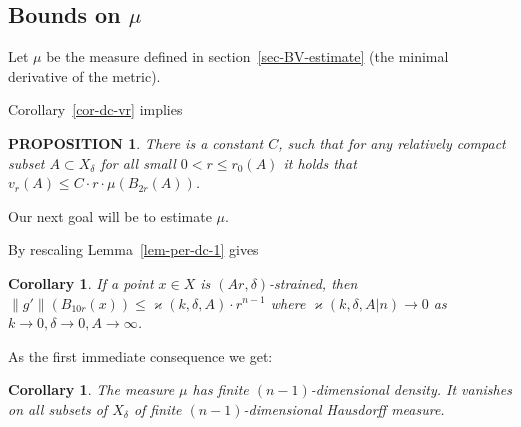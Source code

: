 \documentclass[12pt,leqno]{amsart}
\numberwithin{equation}{section}
\newtheorem{lem}[thm]{Lemma}
\newtheorem{cor}[thm]{Corollary}
\newtheorem{prop}[thm]{PROPOSITION}
\theoremstyle{definition}
\theoremstyle{remark}
\newcommand{\curv}{\mathop{\rm curv}}
\begin{document}
\subsection{Bounds on $\mu$}

 Let
 $\mu$ be the measure defined in  section~\ref{sec-BV-estimate}
 (the minimal derivative of the metric).





Corollary~\ref{cor-dc-vr} implies

 \begin{prop} \label{mainalex}
 There is a constant $C$,
 such that  for any relatively compact subset $A\subset X_\delta$ for all small
 $0<r\leq r_0 (A)$  it holds that  $v_r (A) \leq C \cdot r\cdot \mu  ( B_{2r} (A))$.
 \end{prop}

Our next goal will be to estimate $\mu$.



By rescaling Lemma~\ref{lem-per-dc-1} gives

 \begin{cor}  \label{ballmeasure}
 If a point $x\in X$ is $(Ar,\delta )$-strained, then $\|g'\| (B_{10r} (x) ) \leq \varkappa(k,\delta,A)  \cdot r^{n-1}$ where $\varkappa(k,\delta,A|n)\to 0$ as $k\to 0, \delta\to 0,A\to\infty$.
 \end{cor}



As the first immediate consequence we get:

\begin{cor}\label{cor-n-1-density}
The measure $\mu$ has finite $(n-1)$-dimensional density. It vanishes on all subsets of $X_\delta$ of finite $(n-1)$-dimensional
Hausdorff measure.
\end{cor}
\end{document}
